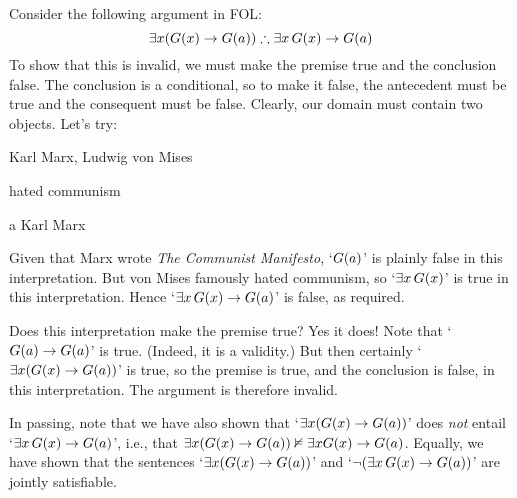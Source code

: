 Consider the following argument in FOL:
$$\exists x(\atom{G}{x} \eif \atom{G}{a}) \therefore \exists x\, \atom{G}{x} \eif \atom{G}{a}$$
To show that this is invalid, we must make the premise true and the conclusion false. The conclusion is a conditional, so to make it false, the antecedent must be true and the consequent must be false. Clearly, our domain must contain two objects. Let's try:
	\begin{ekey}
		\item[\text{domain}] Karl Marx, Ludwig von Mises
		\item[\atom{G}{x}]  hated communism
		\item[a] Karl Marx
	\end{ekey}
Given that Marx wrote \emph{The Communist Manifesto}, `$\mathord{G}(a)$' is plainly false in this interpretation. But von Mises famously hated communism, so `$\exists x\, \mathord{G}(x)$' is true in this interpretation. Hence `$\exists x\, \mathord{G}(x) \rightarrow \mathord{G}(a)$' is false, as required. 

Does this interpretation make the premise true? Yes it does! Note that `$\mathord{G}(a) \rightarrow \mathord{G}(a)$' is true. (Indeed, it is a validity.) But then certainly `$\exists x (\mathord{G}(x) \rightarrow \mathord{G}(a))$' is true, so the premise is true, and the conclusion is false, in this interpretation. The argument is therefore invalid. 

In passing, note that we have also shown that `$\exists x(\mathord{G}(x) \rightarrow \mathord{G}(a))$' does \emph{not} entail `$\exists x\, \mathord{G}(x) \rightarrow \mathord{G}(a)$', i.e., that $\exists x (\mathord{G}(x) \rightarrow \mathord{G}(a)) \nvDash \exists x \mathord{G}(x) \rightarrow \mathord{G}(a)$. Equally, we have shown that the sentences `$\exists x (\mathord{G}(x) \rightarrow \mathord{G}(a))$' and `$\neg (\exists x\, \mathord{G}(x) \rightarrow \mathord{G}(a))$' are jointly satisfiable.


